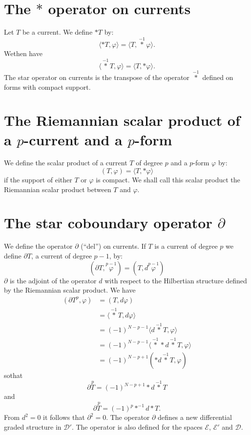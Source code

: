 \section*{The $\ast$ operator on currents}

Let $T$ be a current. We define $\ast T$ by:
$$
\langle \ast T,\varphi\rangle=\langle
T,\overset{-1}{\ast}\varphi\rangle.
$$
We\pageoriginale then have
$$
\langle \overset{-1}{\ast}T,\varphi\rangle=\langle
T,\ast\varphi\rangle.
$$
The star operator on currents is the transpose of the operator
$\overset{-1}{\ast}$ defined on forms with compact support.

\section*{The Riemannian scalar product of a $p$-current and a
  $p$-form}

We define the scalar product of a current $T$ of degree $p$ and a
$p$-form $\varphi$ by:
$$
(T,\varphi)=\langle T,\ast\varphi\rangle
$$
if the support of either $T$ or $\varphi$ is compact. We shall call
this scalar product the Riemannian scalar product between $T$ and
$\varphi$. 

\section*{The star coboundary operator $\partial$}

We define the operator $\partial$ (``del'') on currents. If $T$ is a
current of degree $p$ we define $\partial T$, a current of degree
$p-1$, by:
$$
(\partial T,\overset{p-1}{\varphi})=(T,d\overset{p-1}{\varphi})
$$
$\partial$ is the adjoint of the operator $d$ with respect to the
Hilbertian structure defined by the Riemannian scalar product. We have
\begin{align*}
(\partial T^{p},\varphi) &= (T,d\varphi)\\
&= \langle \overset{-1}{\ast}T,d\varphi\rangle\\
&= (-1)^{N-p-1}\langle d\overset{-1}{\ast}T,\varphi\rangle\\
&= (-1)^{N-p-1}\langle \overset{-1}{\ast}\ast
  d\overset{-1}{\ast}T,\varphi\rangle\\
&= (-1)^{N-p+1}(\ast d\overset{-1}{\ast}T,\varphi)
\end{align*}
so\pageoriginale that
$$
\partial \overset{p}{T}=(-1)^{N-p+1}\ast d\overset{-1}{\ast}T
$$
and 
$$
\partial \overset{p}{T}=(-1)^{p}\ast^{-1}d\ast T.
$$
From $d^{2}=0$ it follows that $\partial^{2}=0$. The operator
$\partial$ defines a new differential graded structure in
$\mathscr{D}'$. The operator is also defined for the spaces
$\mathscr{E}$, $\mathscr{E}'$ and $\mathscr{D}$.

